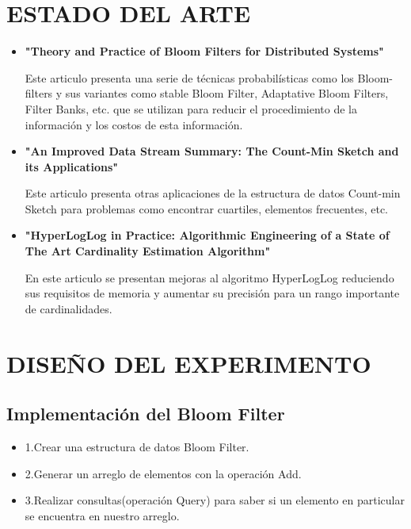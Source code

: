 \documentclass[journal]{IEEEtran}
\begin{document}
\section{ESTADO DEL ARTE}

\begin{itemize}

\item \textbf{"Theory and Practice of Bloom Filters for Distributed Systems"}

Este articulo presenta una serie de t\'ecnicas probabil\'isticas como los Bloom-filters y sus variantes como stable Bloom Filter, Adaptative Bloom Filters, Filter Banks, etc. que se utilizan para reducir el procedimiento de la informaci\'on y los costos de esta informaci\'on.\\

\item \textbf{"An Improved Data Stream Summary: The Count-Min Sketch and its Applications"}

Este articulo presenta otras aplicaciones de la estructura de datos Count-min Sketch para problemas como encontrar cuartiles, elementos frecuentes, etc.\\

\item \textbf{"HyperLogLog in Practice: Algorithmic Engineering of a State of The Art Cardinality Estimation Algorithm"}

En este articulo se presentan mejoras al algoritmo HyperLogLog reduciendo sus requisitos de memoria y aumentar su precisi\'on para un rango importante de cardinalidades.\\

\end{itemize}


\section{DISEÑO DEL EXPERIMENTO}

\subsection{Implementaci\'on del Bloom Filter}

    \begin{itemize}
	    \item
            1.Crear una estructura de datos Bloom Filter.
	    \item
	    2.Generar un arreglo de elementos con la operaci\'on Add.
	    \item
	    3.Realizar consultas(operaci\'on Query) para saber si un elemento en particular se encuentra en nuestro arreglo.
        \end{itemize}
\end{document}
